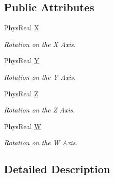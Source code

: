 \subsection*{Public Attributes}
\begin{DoxyCompactItemize}
\item 
\hypertarget{classPhysQuaternion_ac6ef4975979103a0285379e166dafc9c}{
PhysReal \hyperlink{classPhysQuaternion_ac6ef4975979103a0285379e166dafc9c}{X}}
\label{d5/d19/classPhysQuaternion_ac6ef4975979103a0285379e166dafc9c}

\begin{DoxyCompactList}\small\item\em Rotation on the X Axis. \item\end{DoxyCompactList}\item 
\hypertarget{classPhysQuaternion_a2b07bc54cfd68f82588cb869f8ef4428}{
PhysReal \hyperlink{classPhysQuaternion_a2b07bc54cfd68f82588cb869f8ef4428}{Y}}
\label{d5/d19/classPhysQuaternion_a2b07bc54cfd68f82588cb869f8ef4428}

\begin{DoxyCompactList}\small\item\em Rotation on the Y Axis. \item\end{DoxyCompactList}\item 
\hypertarget{classPhysQuaternion_a991d092617466f15ab7c297059668cf2}{
PhysReal \hyperlink{classPhysQuaternion_a991d092617466f15ab7c297059668cf2}{Z}}
\label{d5/d19/classPhysQuaternion_a991d092617466f15ab7c297059668cf2}

\begin{DoxyCompactList}\small\item\em Rotation on the Z Axis. \item\end{DoxyCompactList}\item 
\hypertarget{classPhysQuaternion_a5569a775ccde5755ffa4a12a0a31c555}{
PhysReal \hyperlink{classPhysQuaternion_a5569a775ccde5755ffa4a12a0a31c555}{W}}
\label{d5/d19/classPhysQuaternion_a5569a775ccde5755ffa4a12a0a31c555}

\begin{DoxyCompactList}\small\item\em Rotation on the W Axis. \item\end{DoxyCompactList}\end{DoxyCompactItemize}


\subsection{Detailed Description}



